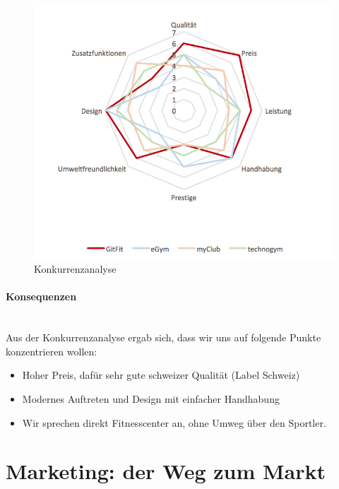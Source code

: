 \begin{figure}[H]
\centering
\includegraphics[width=0.9\linewidth]{images/konkurrenz}
\caption{Konkurrenzanalyse}
\label{fig:konkurrenz}
\end{figure}
\paragraph{Konsequenzen}\hfill \\
Aus der Konkurrenzanalyse ergab sich, dass wir uns auf folgende Punkte konzentrieren wollen:
\begin{itemize}
	\item Hoher Preis, dafür sehr gute schweizer Qualität (Label Schweiz)
	\item Modernes Auftreten und Design mit einfacher Handhabung
	\item Wir sprechen direkt Fitnesscenter an, ohne Umweg über den Sportler.
\end{itemize}

\clearpage
\section{Marketing: der Weg zum Markt}\label{sec:marketing-der-weg-zum-markt}

